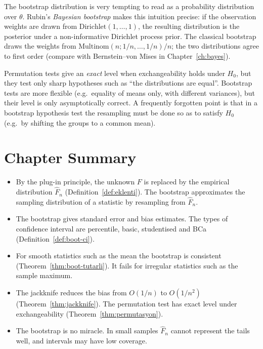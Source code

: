 \documentclass[main.tex]{subfiles}
\begin{document}
\begin{remark}
The bootstrap distribution is very tempting to read as a probability distribution over $\theta$. Rubin's \cite{rubin81} \emph{Bayesian bootstrap} makes this intuition precise: if the observation weights are drawn from $\text{Dirichlet}(1,\dots,1)$, the resulting distribution is the posterior under a non-informative Dirichlet process prior. The classical bootstrap draws the weights from $\text{Multinom}(n;1/n,\dots,1/n)/n$; the two distributions agree to first order (compare with Bernstein--von Mises in Chapter~\ref{ch:bayes}).
\end{remark}

\begin{remark}
Permutation tests give an \emph{exact} level when exchangeability holds under $H_0$, but they test only sharp hypotheses such as ``the distributions are equal''. Bootstrap tests are more flexible (e.g.\ equality of means only, with different variances), but their level is only asymptotically correct. A frequently forgotten point is that in a bootstrap hypothesis test the resampling must be done so as to satisfy $H_0$ (e.g.\ by shifting the groups to a common mean).
\end{remark}

\section{Chapter Summary}
\begin{summary}
\begin{itemize}
  \item By the plug-in principle, the unknown $F$ is replaced by the empirical distribution $\hat F_n$ (Definition~\ref{def:eklenti}). The bootstrap approximates the sampling distribution of a statistic by resampling from $\hat F_n$.
  \item The bootstrap gives standard error and bias estimates. The types of confidence interval are percentile, basic, studentised and BCa (Definition~\ref{def:boot-ci}).
  \item For smooth statistics such as the mean the bootstrap is consistent (Theorem~\ref{thm:boot-tutarli}). It fails for irregular statistics such as the sample maximum.
  \item The jackknife reduces the bias from $O(1/n)$ to $O(1/n^2)$ (Theorem~\ref{thm:jackknife}). The permutation test has exact level under exchangeability (Theorem~\ref{thm:permutasyon}).
  \item The bootstrap is no miracle. In small samples $\hat F_n$ cannot represent the tails well, and intervals may have low coverage.
\end{itemize}
\end{summary}
\end{document}
